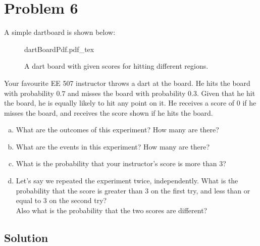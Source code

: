 \section{Problem 6}
A simple dartboard is shown below:

\begin{figure}[!ht]
	\centering
	{dartBoardPdf.pdf_tex}
	\caption{A dart board with given scores for hitting different regions.}
	\label{fig:dartBoard}
\end{figure}

Your favourite EE 507 instructor throws a dart at the board. He hits the board with probability $0.7$ and misses the board with probability $0.3$. Given that he hit the board, he is equally likely to hit any point on it. He receives a score of $0$ if he misses the board, and receives the score shown if he hits the board.

\begin{enumerate}[a.]
	\item What are the outcomes of this experiment? How many are there?
	\item What are the events in this experiment? How many are there?
	\item What is the probability that your instructor's score is more than $3$?
	\item Let's say we repeated the experiment twice, independently. What is the probability that the score is greater than $3$ on the first try, and less than or equal to 3 on the second try?\\
	Also what is the probability that the two scores are different?
\end{enumerate}

\subsection{Solution}
